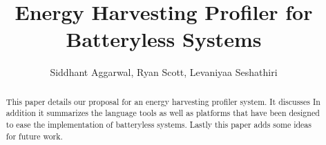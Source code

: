 \documentclass[10pt, sigconf ]{acmart}
\title{Energy Harvesting Profiler for Batteryless Systems}
\author{Siddhant Aggarwal, Ryan Scott, Levaniyaa Seshathiri}
\begin{document}
\begin{abstract}
 This paper details our proposal for an energy harvesting profiler system.
 It discusses
 In addition it summarizes the language tools as well as platforms that have been designed to ease the implementation of batteryless systems.
 Lastly this paper adds some ideas for future work.
\end{abstract}

\maketitle


%
%
%




\end{document}
